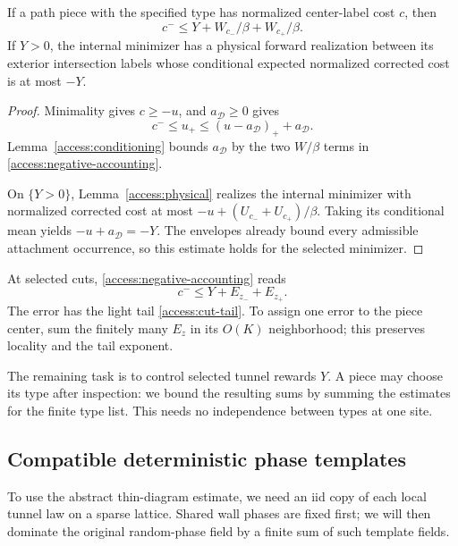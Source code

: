 \begin{lemma}\label{access:accounting}
If a path piece with the specified type has normalized center-label cost
$c$, then
\begin{equation}\label{access:negative-accounting}
            c^-\le Y+W_{c_-}/\beta+W_{c_+}/\beta.
\end{equation}
If $Y>0$, the internal minimizer has a physical forward realization
between its exterior intersection labels whose conditional expected
normalized corrected cost is at most $-Y$.
\end{lemma}

\begin{proof}
Minimality gives $c\ge-u$, and $a_{\mathcal D}\ge0$ gives
\[
 c^-\le u_+\le (u-a_{\mathcal D})_++a_{\mathcal D}.
\]
Lemma~\ref{access:conditioning} bounds $a_{\mathcal D}$ by the two
$W/\beta$ terms in \eqref{access:negative-accounting}.

On $\{Y>0\}$, Lemma~\ref{access:physical} realizes the internal
minimizer with normalized corrected cost at most
$-u+(U_{c_-}+U_{c_+})/\beta$.  Taking its conditional mean yields
$-u+a_{\mathcal D}=-Y$.  The envelopes already bound every admissible
attachment occurrence, so this estimate holds for the selected minimizer.
\end{proof}

At selected cuts, \eqref{access:negative-accounting} reads
\[
                    c^-\le Y+E_{z_-}+E_{z_+}.
\]
The error has the light tail \eqref{access:cut-tail}.  To assign one error
to the piece center, sum the finitely many $E_z$ in its $O(K)$
neighborhood; this preserves locality and the tail exponent.

The remaining task is to control selected tunnel rewards $Y$.  A piece
may choose its type after inspection: we bound the resulting sums by
summing the estimates for the finite type list.  This needs no
independence between types at one site.

\subsection{Compatible deterministic phase templates}\label{access:phases}

To use the abstract thin-diagram estimate, we need an iid copy of each
local tunnel law on a sparse lattice.  Shared wall phases are fixed
first; we will then dominate the original random-phase field by a finite
sum of such template fields.

